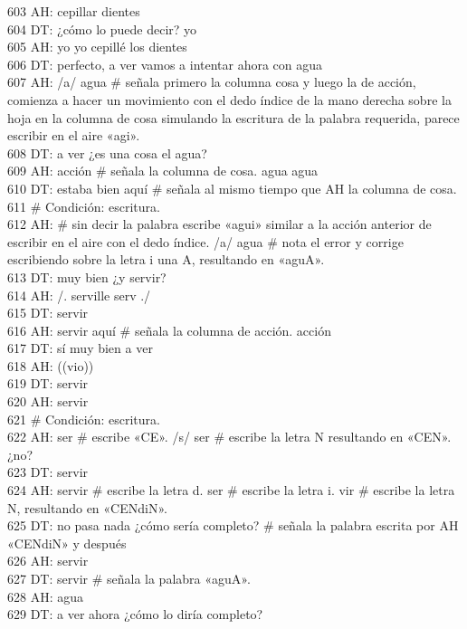603 AH: cepillar dientes\\
604 DT: ¿cómo lo puede decir? yo\\
605 AH: yo yo cepillé los dientes\\
606 DT: perfecto, a ver vamos a intentar ahora con agua\\
607 AH: /a/ agua \# señala primero la columna cosa y luego la de acción, comienza a hacer un movimiento con el dedo índice de la mano derecha sobre la hoja en la columna de cosa simulando la escritura de la palabra requerida, parece escribir en el aire «agi».\\
608 DT: a ver ¿es una cosa el agua?\\
609 AH: acción \# señala la columna de cosa. agua agua\\
610 DT: estaba bien aquí \# señala al mismo tiempo que AH la columna de cosa.\\
611 \# Condición: escritura.\\
612 AH: \# sin decir la palabra escribe «agui» similar a la acción anterior de escribir en el aire con el dedo índice. /a/ agua \# nota el error y corrige escribiendo sobre la letra i una A, resultando en «aguA».\\
613 DT: muy bien ¿y servir?\\
614 AH: /. serville serv ./ \\
615 DT: servir\\
616 AH: servir aquí \# señala la columna de acción. acción\\
617 DT: sí muy bien a ver\\
618 AH: ((vio))\\
619 DT: servir\\
620 AH: servir\\
621 \# Condición: escritura.\\
622 AH: ser \# escribe «CE». /s/ ser \# escribe la letra N resultando en «CEN». ¿no?\\
623 DT: servir\\
624 AH: servir \# escribe la letra d. ser \# escribe la letra i. vir \# escribe la letra N, resultando en «CENdiN».\\
625 DT: no pasa nada ¿cómo sería completo? \# señala la palabra escrita por AH «CENdiN» y después\\
626 AH: servir\\
627 DT: servir \# señala la palabra «aguA».\\
628 AH: agua\\
629 DT: a ver ahora ¿cómo lo diría completo?\\
